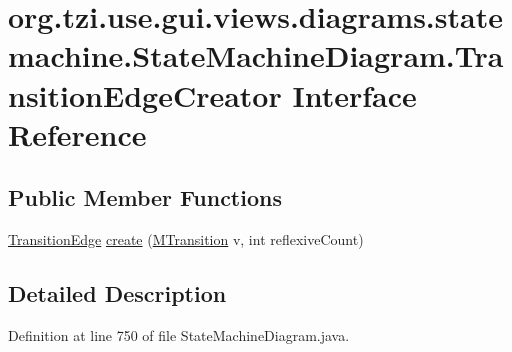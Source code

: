 \hypertarget{interfaceorg_1_1tzi_1_1use_1_1gui_1_1views_1_1diagrams_1_1statemachine_1_1_state_machine_diagram_1_1_transition_edge_creator}{\section{org.\-tzi.\-use.\-gui.\-views.\-diagrams.\-statemachine.\-State\-Machine\-Diagram.\-Transition\-Edge\-Creator Interface Reference}
\label{interfaceorg_1_1tzi_1_1use_1_1gui_1_1views_1_1diagrams_1_1statemachine_1_1_state_machine_diagram_1_1_transition_edge_creator}
}
\subsection*{Public Member Functions}
\begin{DoxyCompactItemize}
\item 
\hyperlink{classorg_1_1tzi_1_1use_1_1gui_1_1views_1_1diagrams_1_1statemachine_1_1_transition_edge}{Transition\-Edge} \hyperlink{interfaceorg_1_1tzi_1_1use_1_1gui_1_1views_1_1diagrams_1_1statemachine_1_1_state_machine_diagram_1_1_transition_edge_creator_a65cd412a354ab27f79f809cb67590e6d}{create} (\hyperlink{classorg_1_1tzi_1_1use_1_1uml_1_1mm_1_1statemachines_1_1_m_transition}{M\-Transition} v, int reflexive\-Count)
\end{DoxyCompactItemize}


\subsection{Detailed Description}


Definition at line 750 of file State\-Machine\-Diagram.\-java.



